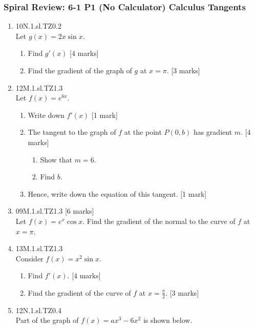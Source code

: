 \documentclass[12pt, twoside]{article}
\begin{document}
\subsubsection*{Spiral Review: 6-1 P1 (No Calculator) Calculus Tangents}
 \begin{enumerate}

  \item 10N.1.sl.TZ0.2\\
  Let $g(x)=2x \sin x$.
  \begin{enumerate}
    \item Find $g'(x)$ [4 marks]
    \item Find the gradient of the graph of $g$ at $x=\pi$. [3 marks]
  \end{enumerate}

  \item 12M.1.sl.TZ1.3\\
  Let $f(x)=e^{6x}$.
  \begin{enumerate}
    \item Write down $f'(x)$ [1 mark]
    \item The tangent to the graph of $f$ at the point $P(0,b)$ has gradient $m$.  [4 marks]
    \begin{enumerate}
      \item Show that $m=6$.
      \item Find $b$.
    \end{enumerate}
    \item Hence, write down the equation of this tangent. [1 mark]
  \end{enumerate}

  \item 09M.1.sl.TZ1.3 [6 marks]\\
  Let $f(x)=e^{x} \cos x$. Find the gradient of the normal to the curve of $f$ at $x= \pi$.

  \item 13M.1.sl.TZ1.3\\
  Consider $f(x)=x^2 \sin x$.
  \begin{enumerate}
    \item Find $f'(x)$. [4 marks]
    \item Find the gradient of the curve of $f$ at $x= \frac{\pi}{2}$. [3 marks]
  \end{enumerate}

  \item 12N.1.sl.TZ0.4\\
  Part of the graph of $f(x)= ax^3-6x^2$ is shown below.
    \begin{center}
    \end{center}


\end{enumerate}
\end{document}

